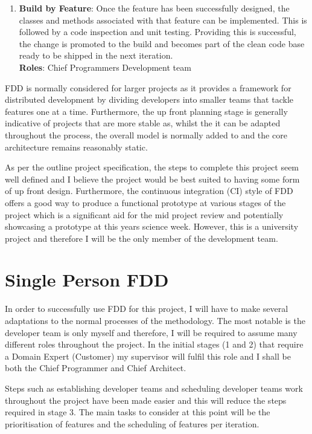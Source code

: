 \documentclass{article}
\begin{document}
\begin{enumerate}
	
	\item \textbf{Build by Feature}: Once the feature has been successfully designed, the classes and methods associated with that feature can be implemented. This is followed by a code inspection and unit testing. Providing this is successful, the change is promoted to the build and becomes part of the clean code base ready to be shipped in the next iteration.
	\\
	\textbf{Roles}: Chief Programmers \textbullet{} Development team

\end{enumerate}

FDD is normally considered for larger projects as it provides a framework for distributed development by dividing developers into smaller teams that tackle features one at a time. Furthermore, the up front planning stage is generally indicative of projects that are more stable as, whilst the it can be adapted throughout the process, the overall model is normally added to and the core architecture remains reasonably static.

As per the outline project specification, the steps to complete this project seem well defined and I believe the project would be best suited to having some form of up front design. Furthermore, the continuous integration (CI) style of FDD offers a good way to produce a functional prototype at various stages of the project which is a significant aid for the mid project review and potentially showcasing a prototype at this years science week. However, this is a university project and therefore I will be the only member of the development team.

\section{Single Person FDD}
In order to successfully use FDD for this project, I will have to make several adaptations to the normal processes of the methodology. The most notable is the developer team is only myself and therefore, I will be required to assume many different roles throughout the project. In the initial stages (1 and 2) that require a Domain Expert (Customer) my supervisor will fulfil this role and I shall be both the Chief Programmer and Chief Architect.

Steps such as establishing developer teams and scheduling developer teams work throughout the project have been made easier and this will reduce the steps required in stage 3. The main tasks to consider at this point will be the prioritisation of features and the scheduling of features per iteration.
\end{document}
